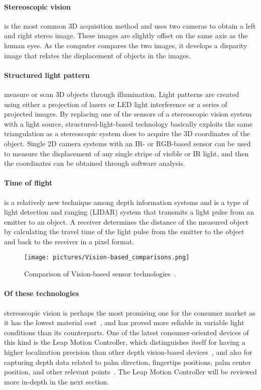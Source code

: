 \paragraph{Stereoscopic vision}is the most common 3D acquisition method and uses two cameras to obtain a left and right stereo image. These images are slightly offset on the same axis as the human eyes. As the computer compares the two images, it develops a disparity image that relates the displacement of objects in the images.

\paragraph{Structured light pattern}measure or scan 3D objects through illumination. Light patterns are created using either a projection of lasers or LED light interference or a series of projected images. By
replacing one of the sensors of a stereoscopic vision system with a light source, structured-light-based technology basically exploits the same triangulation as a stereoscopic system does to acquire the 3D coordinates of the object. Single 2D camera systems with an IR- or RGB-based sensor can be used to measure the displacement of any single stripe of visible or IR light, and then the coordinates can be obtained through software analysis.

\paragraph{Time of flight}is a relatively new technique among depth information systems
and is a type of light detection and ranging (LIDAR) system that transmits a light pulse from an emitter to an object. A receiver determines the distance of the measured object by calculating the travel time of the light pulse from the emitter to the object and back to the receiver in a pixel format.

\begin{figure}%
	\texttt{[image: pictures/Vision-based\_comparisons.png]}
	\caption{Comparison of Vision-based sensor technologies~\citep{Ko2012}.}
	\label{fig:VBComparisions}
\end{figure} 

\paragraph{Of these technologies} stereoscopic vision is perhaps the most promising one for the consumer market as it has the lowest material cost~\citep{Ko2012}, and has proved more reliable in variable light conditions than its counterparts. One of the latest consumer-oriented devices of this kind is the Leap Motion Controller, which distinguishes itself for having a higher localization precision than other depth vision-based devices~\citep{Weichert2013}, and also for capturing depth data related to palm direction, fingertips positions, palm center position, and other relevant points~\citep{Wei2016}. The Leap Motion Controller will be reviewed more in-depth in the next section. 

